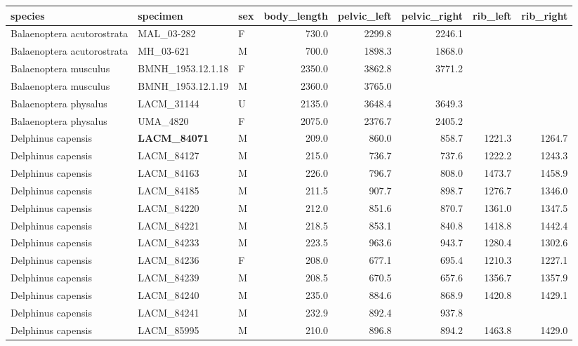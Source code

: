 \begin{table}[ht]
\centering
\begin{tabular}{lllrrrrr}
  \hline
species & specimen & sex & body\_length & pelvic\_left & pelvic\_right & rib\_left & rib\_right \\ 
  \hline
Balaenoptera acutorostrata & MAL\_03-282 & F & 730.0 & 2299.8 & 2246.1 &  &  \\ 
  Balaenoptera acutorostrata & MH\_03-621 & M & 700.0 & 1898.3 & 1868.0 &  &  \\ 
  Balaenoptera musculus & BMNH\_1953.12.1.18 & F & 2350.0 & 3862.8 & 3771.2 &  &  \\ 
  Balaenoptera musculus & BMNH\_1953.12.1.19 & M & 2360.0 & 3765.0 &  &  &  \\ 
  Balaenoptera physalus & LACM\_31144 & U & 2135.0 & 3648.4 & 3649.3 &  &  \\ 
  Balaenoptera physalus & UMA\_4820 & F & 2075.0 & 2376.7 & 2405.2 &  &  \\ 
  Delphinus capensis & \textbf{ LACM\_84071 } & M & 209.0 & 860.0 & 858.7 & 1221.3 & 1264.7 \\ 
  Delphinus capensis & LACM\_84127 & M & 215.0 & 736.7 & 737.6 & 1222.2 & 1243.3 \\ 
  Delphinus capensis & LACM\_84163 & M & 226.0 & 796.7 & 808.0 & 1473.7 & 1458.9 \\ 
  Delphinus capensis & LACM\_84185 & M & 211.5 & 907.7 & 898.7 & 1276.7 & 1346.0 \\ 
  Delphinus capensis & LACM\_84220 & M & 212.0 & 851.6 & 870.7 & 1361.0 & 1347.5 \\ 
  Delphinus capensis & LACM\_84221 & M & 218.5 & 853.1 & 840.8 & 1418.8 & 1442.4 \\ 
  Delphinus capensis & LACM\_84233 & M & 223.5 & 963.6 & 943.7 & 1280.4 & 1302.6 \\ 
  Delphinus capensis & LACM\_84236 & F & 208.0 & 677.1 & 695.4 & 1210.3 & 1227.1 \\ 
  Delphinus capensis & LACM\_84239 & M & 208.5 & 670.5 & 657.6 & 1356.7 & 1357.9 \\ 
  Delphinus capensis & LACM\_84240 & M & 235.0 & 884.6 & 868.9 & 1420.8 & 1429.1 \\ 
  Delphinus capensis & LACM\_84241 & M & 232.9 & 892.4 & 937.8 &  &  \\ 
  Delphinus capensis & LACM\_85995 & M & 210.0 & 896.8 & 894.2 & 1463.8 & 1429.0 \\ 

\end{tabular}
\end{table}
